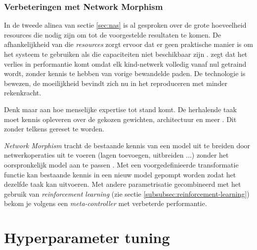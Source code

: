 \subsubsection{Verbeteringen met Network Morphism}
\label{subsubsec:network-morphism}

In de tweede alinea van sectie \ref{sec:nas} is al gesproken over de grote hoeveelheid resources die nodig zijn om tot de voorgestelde resultaten te komen. De afhankelijkheid van die \textit{resources} zorgt ervoor dat er geen praktische manier is om het systeem te gebruiken als die capaciteiten niet beschikbaar zijn \autocite{Cai2017}. \textcite{Cai2017} zegt dat het verlies in performantie komt omdat elk kind-netwerk volledig vanaf nul getraind wordt, zonder kennis te hebben van vorige bewandelde paden. De technologie is bewezen, de moeilijkheid bevindt zich nu in het reproduceren met minder rekenkracht.

Denk maar aan hoe menselijke expertise tot stand komt. De herhalende taak moet kennis opleveren over de gekozen gewichten, architectuur en meer \autocite{Chen2016}. Dit zonder telkens gereset te worden.

\textit{Network Morphism} tracht de bestaande kennis van een model uit te breiden door netwerkoperaties uit te voeren (lagen toevoegen, uitbreiden ...) zonder het oorspronkelijk model aan te passen \autocite{Cai2017}. Met een voorgedefinieerde transformatie functie kan bestaande kennis in een nieuw model gepompt worden zodat het dezelfde taak kan uitvoeren. Met andere parametrisatie gecombineerd met het gebruik van \textit{reinforcement learning} (zie sectie \ref{subsubsec:reinforcement-learning}) bekom je volgens \textcite{Cai2017} een \textit{meta-controller} met verbeterde performantie.

\section{Hyperparameter tuning}
\label{sec:hyperparameter-tuning}

